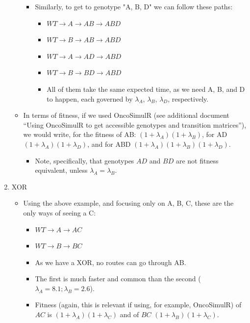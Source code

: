 \documentclass[a4paper,11pt]{article}
\begin{document}
\begin{enumerate}
\begin{itemize}
\begin{itemize}
\item Similarly, to get to genotype "A, B, D" we can follow these paths:
\begin{itemize}
\item \(WT \rightarrow A \rightarrow AB \rightarrow ABD\)
\item \(WT \rightarrow B \rightarrow AB \rightarrow ABD\)
\item \(WT \rightarrow A \rightarrow AD \rightarrow ABD\)
\item \(WT \rightarrow B \rightarrow BD \rightarrow ABD\)
\item All of them take the same expected time, as we need A, B, and D to happen, each governed by \(\lambda_A\), \(\lambda_B\), \(\lambda_D\), respectively.
\end{itemize}
\end{itemize}
\item In terms of fitness, if we used OncoSimulR (see additional document ``Using OncoSimulR to get accessible genotypes and transition matrices''), we would write, for the fitness of AB: \((1 + \lambda_A) (1 + \lambda_B)\), for AD \((1 + \lambda_A) (1 + \lambda_D)\), and for ABD \((1 + \lambda_A) (1 + \lambda_B) (1 + \lambda_D)\).
\begin{itemize}
\item Note, specifically, that genotypes \(AD\) and \(BD\) are not fitness equivalent, unless \(\lambda_A = \lambda_B\).
\end{itemize}
\end{itemize}
\item XOR
\label{sec:orgc1e93a8}
\begin{itemize}
\item Using the above example, and focusing only on A, B, C, these are the only ways of seeing a C:
\begin{itemize}
\item \(WT \rightarrow A \rightarrow AC\)
\item \(WT \rightarrow B \rightarrow BC\)
\item As we have a XOR, no routes can go through AB.
\item The first is much faster and common than the second (\(\lambda_A = 8.1; \lambda_B = 2.6\)).
\item Fitness (again, this is relevant if using, for example, OncoSimulR) of \(AC\) is \((1 + \lambda_A) (1 + \lambda_C)\) and of \(BC\) \((1 + \lambda_B) (1 + \lambda_C)\).
\end{itemize}
\end{itemize}


\end{enumerate}
\end{document}
